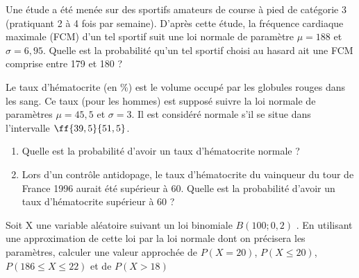 \begin{exercice_cours}[\quad]{}
Une étude a été menée sur des sportifs
amateurs de course à pied de catégorie 3 (pratiquant 2
à 4 fois par semaine). D’après cette étude, la fréquence cardiaque
maximale (FCM) d’un tel sportif suit une loi normale
de paramètre $\mu = 188$ et $\sigma=6,95$.
Quelle est la probabilité qu’un tel sportif choisi au hasard ait
une FCM comprise entre 179 et 180 ?
\end{exercice_cours}

\begin{exercice_cours}[\quad]{}
Le taux d’hématocrite (en \%) est le volume
occupé par les globules rouges dans les sang. Ce taux
(pour les hommes) est supposé suivre la loi normale de paramètres
$\mu = 45,5$ et $\sigma = 3$. Il est considéré normale s’il se situe
dans l’intervalle $\ff{39,5}{51,5}$.

\begin{enumerate}
	\item Quelle est la probabilité d’avoir un taux d’hématocrite
normale ?
	\item Lors d’un contrôle antidopage, le taux d’hématocrite
du vainqueur du tour de France 1996 aurait été supérieur
à 60. Quelle est la probabilité d’avoir un taux d’hématocrite supérieur à 60 ?
\end{enumerate}

\end{exercice_cours}


\begin{exercice_cours}[\quad]{}
Soit X une variable aléatoire suivant un loi
binomiale $B(100; 0,2)$ . En utilisant une approximation de
cette loi par la loi normale dont on précisera les paramètres,
calculer une valeur approchée de $P(X = 20)$, $P(X \leq 20)$,
$P(186 \leq X \leq 22)$ et de $P(X > 18)$


\end{exercice_cours}

